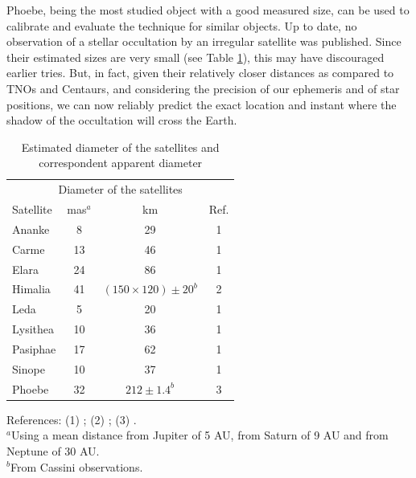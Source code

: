 \documentclass[useAMS,usenatbib]{mn2e}
\begin{document}
Phoebe, being the most studied object with a good measured size, can be used to calibrate and evaluate the technique for similar objects. Up to date, no observation of a stellar occultation by an irregular satellite was published. Since their estimated sizes are very small (see Table \ref{Tab: satellite-diameter}), this may have discouraged earlier tries. But, in fact, given their relatively closer distances as compared to TNOs and Centaurs, and considering the precision of our ephemeris and of star positions, we can now reliably predict the exact location and instant where the shadow of the occultation will cross the Earth.

\begin{table}
\caption{\label{Tab: satellite-diameter} Estimated diameter of the satellites and correspondent apparent diameter}
\begin{center}
\begin{tabular}{lccc}
\hline  \hline
\multicolumn{4}{c}{Diameter of the satellites} \tabularnewline
Satellite  & mas$^ {a}$  & km & Ref. \tabularnewline
\hline
Ananke & 8 & 29 & 1 \tabularnewline
Carme & 13 & 46 & 1 \tabularnewline
Elara & 24 & 86 & 1 \tabularnewline
Himalia & 41 & $(150\times120) \pm 20^{b}$ & 2 \tabularnewline
Leda & 5 & 20 & 1 \tabularnewline
Lysithea & 10 & 36 & 1 \tabularnewline
Pasiphae & 17 & 62 & 1 \tabularnewline
Sinope & 10 & 37 & 1 \tabularnewline
\hdashline
Phoebe & 32 & $212 \pm 1.4^{b}$ & 3 \tabularnewline
\hline
\end{tabular}
\end{center}
References: (1) \cite{Rettig2001}; (2) \cite{Porco2003}; (3) \cite{Thomas2010}.\\
$^{a}${Using a mean distance from Jupiter of 5 AU, from Saturn of 9 AU and from Neptune of 30 AU.}\\
$^{b}${From Cassini observations.}
\par
\end{table}

\end{document}
